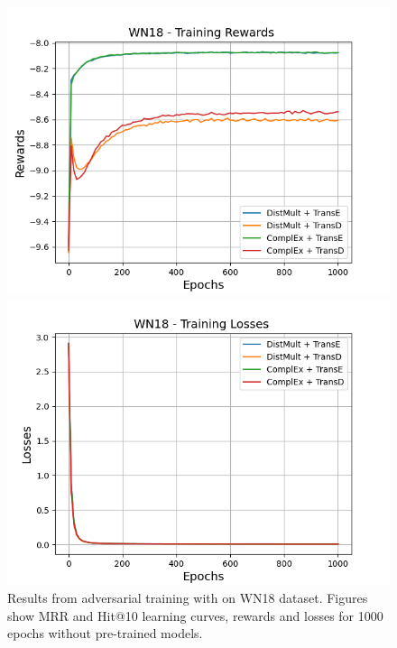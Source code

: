 \begin{figure}[H]
    \begin{minipage}{.5\textwidth}
      \centering
      \includegraphics[width=\linewidth]{figures/results/gan_train/not_pretrained/uncertainty/max_distribution/entropy/wn18/1k_epochs/uncertainty_wn18_rew.png}
    \end{minipage}%
     \begin{minipage}{.5\textwidth}
      \centering
      \includegraphics[width=\linewidth]{figures/results/gan_train/not_pretrained/uncertainty/max_distribution/entropy/wn18/1k_epochs/uncertainty_wn18_losses.png}
    \end{minipage}%
    \caption{Results from adversarial training with \ussoftmax on \textsc{WN18} dataset.
    Figures show MRR and Hit@10 learning curves, rewards and losses for 1000 epochs without pre-trained models.}
    \label{fig:gan_train_not_pretrained_ussoftmax_wn18}
\end{figure}
